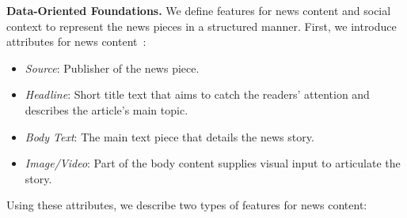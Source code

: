 \textbf{Data-Oriented Foundations.} We define features for news content and social context to represent the news pieces in a structured manner. First, we introduce attributes for news content~\parencite{FakeNewsDetectionOnSocialMediaADataMiningPerspective_Shu}:
\begin{itemize}
    \item \emph{Source}: Publisher of the news piece.
    \item \emph{Headline}: Short title text that aims to catch the readers’ attention and describes the article's main topic.
    \item \emph{Body Text}: The main text piece that details the news story.
    \item \emph{Image/Video}: Part of the body content supplies visual input to articulate the story.
\end{itemize}
Using these attributes, we describe two types of features for news content:
